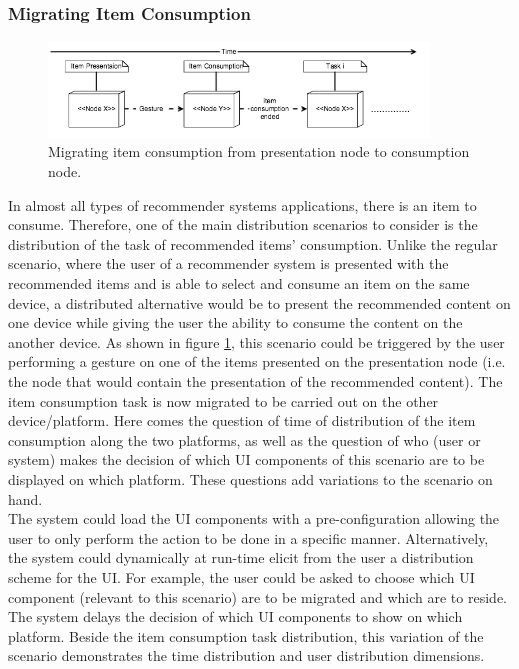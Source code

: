 \subsubsection{Migrating Item Consumption}
\begin{figure}[!htpb]
\includegraphics[width=0.9\textwidth, center, center]{figures/generic1}
\caption{Migrating item consumption from presentation node to consumption node.}
\label{fig:figure31}
\end{figure}                    
In almost all types of recommender systems applications, there is an item to
consume. Therefore, one of the main distribution scenarios to consider is the
distribution of the task of recommended items' consumption. Unlike the regular
scenario, where the user of a recommender system is presented with the
recommended items and is able to select and consume an item on the same device,
a distributed alternative would be to present the recommended content on one
device while giving the user the ability to consume the content on the another device. As shown in figure \ref{fig:figure31}, this scenario could be triggered by the user performing a gesture on one of the items presented on the presentation node (i.e. the node that would contain the presentation of the recommended content). The item consumption task is now migrated to be carried out on the other device/platform.
Here comes the question of time of distribution of the item consumption along the two platforms, as well as the question of who (user or system) makes the decision of which UI components of this scenario are to be displayed on which platform. These questions add variations to the scenario on hand.\\
The system could load the UI components with a pre-configuration allowing the user to only perform the action to be done in a specific manner. Alternatively, the system could dynamically at run-time elicit from the user a distribution scheme for the UI. For example, the user could be asked to choose which UI component (relevant to this scenario) are to be migrated and which are to reside. The system delays the decision of which UI components to show on which platform. Beside the item consumption task distribution, this variation of the scenario demonstrates the time distribution and user distribution dimensions.
      
